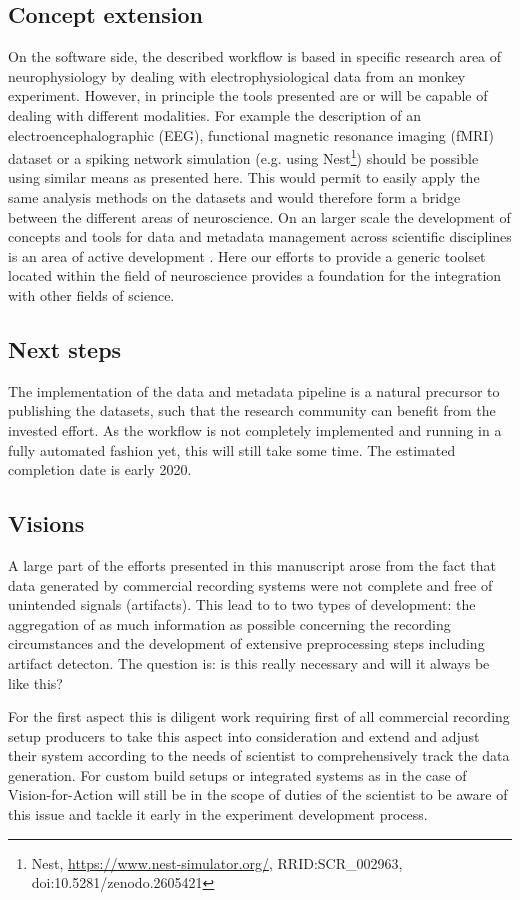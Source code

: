 \subsection{Concept extension}
On the software side, the described workflow is based in specific research area of neurophysiology by dealing with electrophysiological data from an monkey experiment. However, in principle the tools presented are or will be capable of dealing with different modalities. For example the description of an electroencephalographic (EEG), functional magnetic resonance imaging (fMRI) dataset or a spiking network simulation (e.g. using Nest\footnote{Nest, \url{https://www.nest-simulator.org/}, RRID:SCR\_002963, doi:10.5281/zenodo.2605421}) should be possible using similar means as presented here. This would permit to easily apply the same analysis methods on the datasets and would therefore form a bridge between the different areas of neuroscience.
On an larger scale the development of concepts and tools for data and metadata management across scientific disciplines is an area of active development . Here our efforts to provide a generic toolset located within the field of neuroscience provides a foundation for the integration with other fields of science.

\subsection{Next steps}
The implementation of the data and metadata pipeline is a natural precursor to publishing the datasets, such that the research community can benefit from the invested effort. As the workflow is not completely implemented and running in a fully automated fashion yet, this will still take some time. The estimated completion date is early 2020.

\subsection{Visions}
A large part of the efforts presented in this manuscript arose from the fact that data generated by commercial recording systems were not complete and free of unintended signals (artifacts). This lead to to two types of development: the aggregation of as much information as possible concerning the recording circumstances and the development of extensive preprocessing steps including artifact detecton. The question is: is this really necessary and will it always be like this?

For the first aspect this is diligent work requiring first of all commercial recording setup producers to take this aspect into consideration and extend and adjust their system according to the needs of scientist to comprehensively track the data generation. For custom build setups or integrated systems as in the case of Vision-for-Action will still be in the scope of duties of the scientist to be aware of this issue and tackle it early in the experiment development process.

